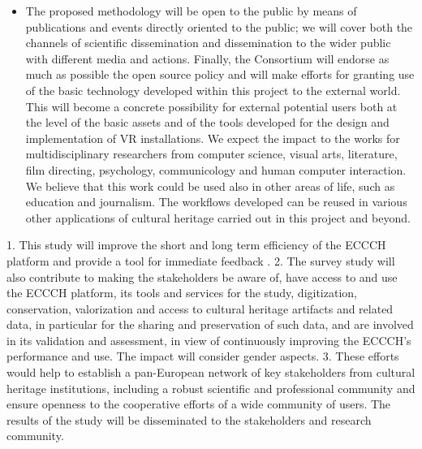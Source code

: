 \begin{itemize}[nosep]
\item The proposed methodology will be open to the public by means of publications and events directly oriented to the public; we will cover both the channels of scientific dissemination and dissemination to the wider public with different media and actions. Finally, the Consortium will endorse as much as possible the open source policy and will make efforts for granting use of the basic technology developed within this project to the external world. This will become a concrete possibility for external potential users both at the level of the basic assets and of the tools developed for the design and implementation of VR installations. We expect the impact to the works for multidisciplinary researchers from computer science, visual arts, literature, ﬁlm directing, psychology, communicology and human computer interaction. We believe that this work could be used also in other areas of life, such as education and journalism. The workﬂows developed can be reused in various other applications of cultural heritage carried  out in this project and beyond.


\end{itemize}

	1. This study will improve the short and long term efficiency of the ECCCH platform and provide a tool for immediate feedback .
	2. The survey study will also contribute to making the stakeholders be aware of, have access to and use the ECCCH platform, its tools and services for the study, digitization, conservation, valorization and access to cultural heritage artifacts and related data, in particular for the sharing and preservation of such data, and are involved in its validation and assessment, in view of continuously improving the ECCCH’s performance and use. The impact will consider gender aspects.
	3. These efforts would help to establish a pan-European network of key stakeholders from cultural heritage institutions, including a robust scientific and professional community and ensure openness to the cooperative efforts of a wide community of users.
The results of the study will be disseminated to the stakeholders and research community.

